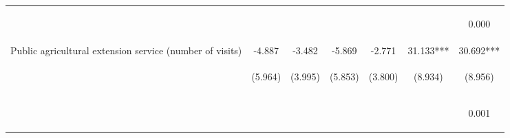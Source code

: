 \begin{center}
\begin{tabular}{lcccccc}
\vspace{4pt} & \begin{footnotesize}[0.473]\end{footnotesize} & \begin{footnotesize}[0.943]\end{footnotesize} & \begin{footnotesize}[0.650]\end{footnotesize} & \begin{footnotesize}[0.815]\end{footnotesize} & \begin{footnotesize}[0.000]\end{footnotesize} & \begin{footnotesize}0.000\end{footnotesize} \\
Public agricultural extension service (number of visits) & -4.887 & -3.482 & -5.869 & -2.771 & 31.133*** & 30.692*** \\
 & \begin{footnotesize}(5.964)\end{footnotesize} & \begin{footnotesize}(3.995)\end{footnotesize} & \begin{footnotesize}(5.853)\end{footnotesize} & \begin{footnotesize}(3.800)\end{footnotesize} & \begin{footnotesize}(8.934)\end{footnotesize} & \begin{footnotesize}(8.956)\end{footnotesize} \\
\vspace{4pt} & \begin{footnotesize}[0.413]\end{footnotesize} & \begin{footnotesize}[0.383]\end{footnotesize} & \begin{footnotesize}[0.316]\end{footnotesize} & \begin{footnotesize}[0.466]\end{footnotesize} & \begin{footnotesize}[0.000]\end{footnotesize} & \begin{footnotesize}0.001\end{footnotesize} \\

\end{tabular}
\end{center}
